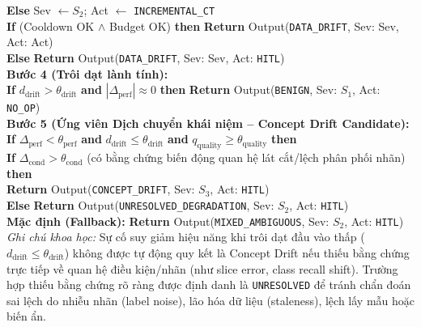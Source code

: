 \begin{tcolorbox}
\hspace*{2em}\textbf{Else} Sev $\leftarrow S_2$; Act $\leftarrow$ \texttt{INCREMENTAL\_CT}\\
\hspace*{2em}\textbf{If} (Cooldown OK $\wedge$ Budget OK) \textbf{then} \textbf{Return} Output(\texttt{DATA\_DRIFT}, Sev: Sev, Act: Act)\\
\hspace*{2em}\textbf{Else} \textbf{Return} Output(\texttt{DATA\_DRIFT}, Sev: Sev, Act: \texttt{HITL})\\[0.25em]
\textbf{Bước 4 (Trôi dạt lành tính):}\\
\hspace*{1em}\textbf{If} $d_\text{drift} > \theta_\text{drift}$ \textbf{and} $|\Delta_\text{perf}| \approx 0$ \textbf{then} \textbf{Return} Output(\texttt{BENIGN}, Sev: $S_1$, Act: \texttt{NO\_OP})\\[0.25em]
\textbf{Bước 5 (Ứng viên Dịch chuyển khái niệm -- Concept Drift Candidate):}\\
\hspace*{1em}\textbf{If} $\Delta_\text{perf} < \theta_\text{perf}$ \textbf{and} $d_\text{drift} \le \theta_\text{drift}$ \textbf{and} $q_\text{quality} \ge \theta_\text{quality}$ \textbf{then}\\
\hspace*{2em}\textbf{If} $\Delta_\text{cond} > \theta_\text{cond}$ (có bằng chứng biến động quan hệ lát cắt/lệch phân phối nhãn) \textbf{then}\\
\hspace*{3em}\textbf{Return} Output(\texttt{CONCEPT\_DRIFT}, Sev: $S_3$, Act: \texttt{HITL})\\
\hspace*{2em}\textbf{Else} \textbf{Return} Output(\texttt{UNRESOLVED\_DEGRADATION}, Sev: $S_2$, Act: \texttt{HITL})\\[0.25em]
\textbf{Mặc định (Fallback):} \textbf{Return} Output(\texttt{MIXED\_AMBIGUOUS}, Sev: $S_2$, Act: \texttt{HITL})\\[0.3em]
\textit{Ghi chú khoa học:} Sự cố suy giảm hiệu năng khi trôi dạt đầu vào thấp ($d_\text{drift} \le \theta_\text{drift}$) không được tự động quy kết là Concept Drift nếu thiếu bằng chứng trực tiếp về quan hệ điều kiện/nhãn (như slice error, class recall shift). Trường hợp thiếu bằng chứng rõ ràng được định danh là \texttt{UNRESOLVED} để tránh chẩn đoán sai lệch do nhiễu nhãn (label noise), lão hóa dữ liệu (staleness), lệch lấy mẫu hoặc biến ẩn.
\end{tcolorbox}


